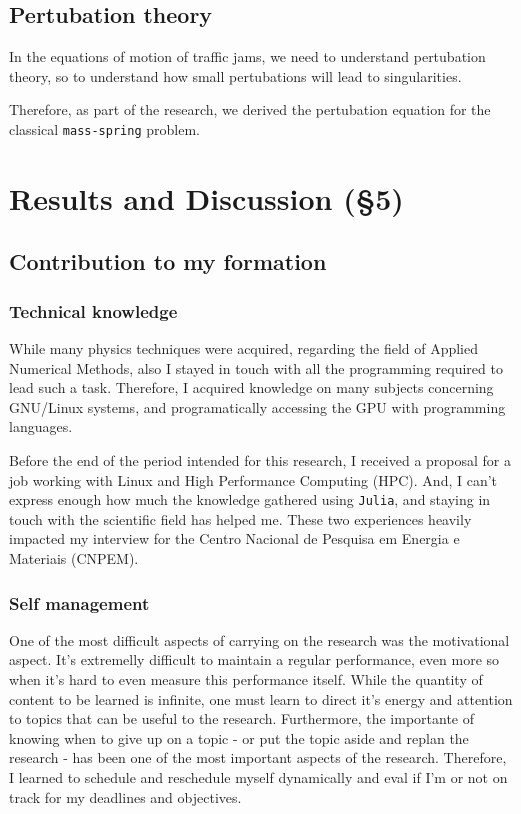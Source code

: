 \documentclass[11pt]{article}
\begin{document}
\subsection{Pertubation theory}
\label{sec:orgd910530}
In the equations of motion of traffic jams, we need to understand pertubation
theory, so to understand how small pertubations will lead to singularities.

Therefore, as part of the research, we derived the pertubation equation for the
classical \texttt{mass-spring} problem.

\section{Results and Discussion (§5)}
\label{sec:orgfe7694b}
\subsection{Contribution to my formation}
\label{sec:orga89dadf}
\subsubsection{Technical knowledge}
\label{sec:orgc4360ac}
While many physics techniques were acquired, regarding the field of Applied
Numerical Methods, also I stayed in touch with all the programming required to
lead such a task. Therefore, I acquired knowledge on many subjects concerning
GNU/Linux systems, and programatically accessing the GPU with programming
languages.

Before the end of the period intended for this research, I received a proposal
for a job working with Linux and High Performance Computing (HPC). And, I can't
express enough how much the knowledge gathered using \texttt{Julia}, and staying in
touch with the scientific field has helped me. These two experiences heavily
impacted my interview for the Centro Nacional de Pesquisa em Energia e
Materiais (CNPEM).

\subsubsection{Self management}
\label{sec:orgfc96ccc}
One of the most difficult aspects of carrying on the research was the
motivational aspect. It's extremelly difficult to maintain a regular
performance, even more so when it's hard to even measure this performance
itself. While the quantity of content to be learned is infinite, one must learn
to direct it's energy and attention to topics that can be useful to the
research. Furthermore, the importante of knowing when to give up on a topic -  or
put the topic aside and replan the research - has been one of the most important
aspects of the research. Therefore, I learned to schedule and reschedule myself
dynamically and eval if I'm or not on track for my deadlines and objectives.
\end{document}

